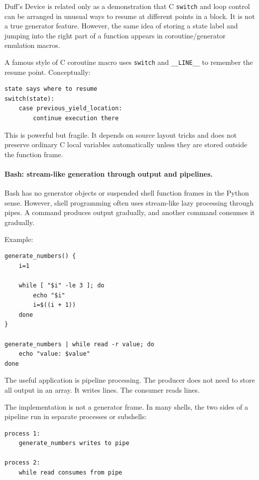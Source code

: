 Duff's Device is related only as a demonstration that C \texttt{switch} and loop control can be arranged in unusual ways to resume at different points in a block. It is not a true generator feature. However, the same idea of storing a state label and jumping into the right part of a function appears in coroutine/generator emulation macros.

A famous style of C coroutine macro uses \texttt{switch} and \texttt{\_\_LINE\_\_} to remember the resume point. Conceptually:

\begin{verbatim}
state says where to resume
switch(state):
    case previous_yield_location:
        continue execution there
\end{verbatim}

This is powerful but fragile. It depends on source layout tricks and does not preserve ordinary C local variables automatically unless they are stored outside the function frame.

\paragraph{Bash: stream-like generation through output and pipelines.}

Bash has no generator objects or suspended shell function frames in the Python sense. However, shell programming often uses stream-like lazy processing through pipes. A command produces output gradually, and another command consumes it gradually.

Example:

\begin{verbatim}
generate_numbers() {
    i=1

    while [ "$i" -le 3 ]; do
        echo "$i"
        i=$((i + 1))
    done
}

generate_numbers | while read -r value; do
    echo "value: $value"
done
\end{verbatim}

The useful application is pipeline processing. The producer does not need to store all output in an array. It writes lines. The consumer reads lines.

The implementation is not a generator frame. In many shells, the two sides of a pipeline run in separate processes or subshells:

\begin{verbatim}
process 1:
    generate_numbers writes to pipe

process 2:
    while read consumes from pipe
\end{verbatim}

